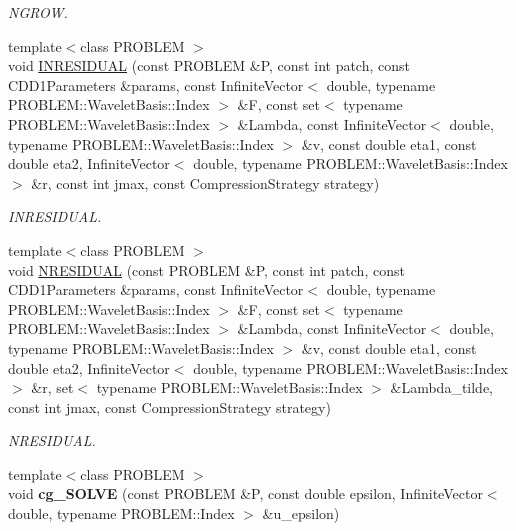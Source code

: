 \begin{CompactItemize}
\begin{CompactList}\small\item\em NGROW. \item\end{CompactList}\item 
{\footnotesize template$<$class PROBLEM $>$ }\\void \hyperlink{namespaceFrameTL_cd7462527bff134a7c142ee0471d6ab2}{INRESIDUAL} (const PROBLEM \&P, const int patch, const CDD1Parameters \&params, const InfiniteVector$<$ double, typename PROBLEM::WaveletBasis::Index $>$ \&F, const set$<$ typename PROBLEM::WaveletBasis::Index $>$ \&Lambda, const InfiniteVector$<$ double, typename PROBLEM::WaveletBasis::Index $>$ \&v, const double eta1, const double eta2, InfiniteVector$<$ double, typename PROBLEM::WaveletBasis::Index $>$ \&r, const int jmax, const CompressionStrategy strategy)
\begin{CompactList}\small\item\em INRESIDUAL. \item\end{CompactList}\item 
{\footnotesize template$<$class PROBLEM $>$ }\\void \hyperlink{namespaceFrameTL_e86daf5e125e66504844e002ba3dc4b5}{NRESIDUAL} (const PROBLEM \&P, const int patch, const CDD1Parameters \&params, const InfiniteVector$<$ double, typename PROBLEM::WaveletBasis::Index $>$ \&F, const set$<$ typename PROBLEM::WaveletBasis::Index $>$ \&Lambda, const InfiniteVector$<$ double, typename PROBLEM::WaveletBasis::Index $>$ \&v, const double eta1, const double eta2, InfiniteVector$<$ double, typename PROBLEM::WaveletBasis::Index $>$ \&r, set$<$ typename PROBLEM::WaveletBasis::Index $>$ \&Lambda\_\-tilde, const int jmax, const CompressionStrategy strategy)
\begin{CompactList}\small\item\em NRESIDUAL. \item\end{CompactList}\item 
\hypertarget{namespaceFrameTL_391c8708bf59582ba636bfb5a394d2b7}{
{\footnotesize template$<$class PROBLEM $>$ }\\void \textbf{cg\_\-SOLVE} (const PROBLEM \&P, const double epsilon, InfiniteVector$<$ double, typename PROBLEM::Index $>$ \&u\_\-epsilon)}
\label{namespaceFrameTL_391c8708bf59582ba636bfb5a394d2b7}


\end{CompactItemize}
